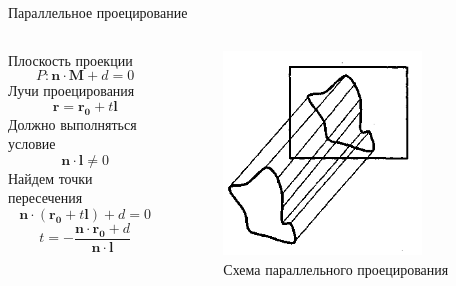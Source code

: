 \documentclass{beamer}
\begin{document}
	\begin{frame}{Параллельное проецирование}
		\begin{columns}
			\begin{column}{0.5\textwidth}
			Плоскость проекции
			\[
				P: \bm{n} \cdot \bm{M} + d = 0	
			\]
			Лучи проецирования
			\[
				\bm{r} = \bm{r_0} + t \bm{l}	
			\]
			Должно выполняться условие
			\[
				\bm{n} \cdot \bm{l} \neq 0	
			\]
			Найдем точки пересечения
			\[
				\bm{n} \cdot (\bm{r_0} + t \bm{l}) + d = 0	
			\]
			\[
				t = -
				\frac{\bm{n} \cdot \bm{r_0} + d}{\bm{n} \cdot \bm{l}}
			\]
			\end{column}
			\begin{column}{0.5\textwidth}
				\begin{figure} 
						\includegraphics[width=0.8\textwidth]{images/parallel_projection.png}
					\caption{Схема параллельного проецирования}
				\end{figure}
			\end{column}
		\end{columns}
			
\end{frame}
\end{document}
